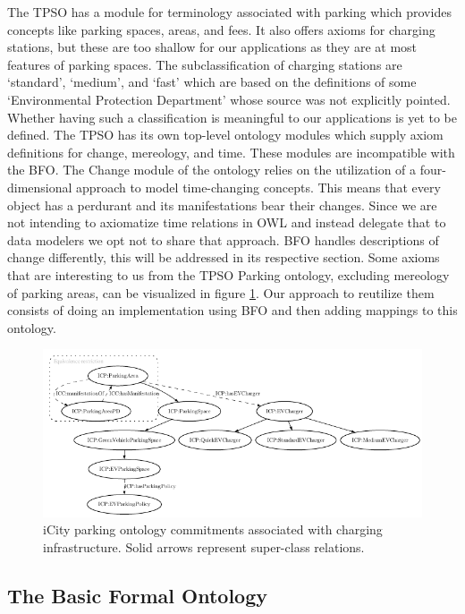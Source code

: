 The TPSO has a module for terminology associated with parking which provides
concepts like parking spaces, areas, and fees. It also offers axioms for
charging stations, but these are too shallow for our applications as they are at
most features of parking spaces. The subclassification of charging stations are
`standard', `medium', and `fast' which are based on the definitions of some
`Environmental Protection Department' whose source was not explicitly pointed.
Whether having such a classification is meaningful to our applications is yet to
be defined. The TPSO has its own top-level ontology modules which supply axiom
definitions for change, mereology, and time. These modules are incompatible with
the BFO. The Change module of the ontology relies on the utilization of a
four-dimensional approach to model time-changing concepts. This means that every
object has a perdurant and its manifestations bear their changes. Since we are
not intending to axiomatize time relations in OWL and instead delegate that to
data modelers we opt not to share that approach. BFO handles descriptions of
change differently, this will be addressed in its respective section. Some
axioms that are interesting to us from the TPSO Parking ontology, excluding
mereology of parking areas, can be visualized in figure \ref{parkingfig}. Our
approach to reutilize them consists of doing an implementation using BFO and
then adding mappings to this ontology. 

\begin{figure}[h]
    \centering
    \includegraphics{images/PARKING.pdf}
    \caption{iCity parking ontology commitments associated with charging infrastructure. Solid arrows represent super-class relations.}
    \label{parkingfig}
\end{figure}

\subsection{The Basic Formal Ontology}
\label{upperlevel}

